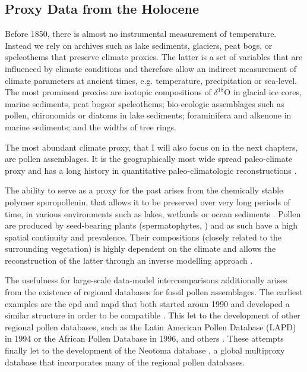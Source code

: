 \begin{refsection}
\subsection{Proxy Data from the Holocene}  \label{sec:intro-paleo-data}
Before 1850, there is almost no instrumental measurement of temperature. Instead we rely on archives such as lake sediments, glaciers, peat bogs, or speleothems that preserve climate proxies. The latter is a set of variables that are influenced by climate conditions and therefore allow an indirect measurement of climate parameters at ancient times, e.g. temperature, precipitation or sea-level. The most prominent proxies are isotopic compositions of $\delta^{18}$O in glacial ice cores\addref, marine sediments\addref, peat bogs\addref or speleothems\addref; bio-ecologic assemblages such as pollen\addref, chironomids \addref or diatoms \addref in lake sediments; foraminifera and alkenone in marine sediments\addref; and the widths of tree rings. 

The most abundant climate proxy, that I will also focus on in the next chapters, are pollen assemblages. It is the  geographically most wide spread paleo-climate proxy \citep{BirksBirks1980}  and has a long history in quantitative paleo-climatologic reconstructions \citep[e.g.][]{Nichols1967, Nichols1969, Bradley1985}. 

The ability to serve as a proxy for the past arises from the chemically stable polymer sporopollenin, that allows it to be preserved over very long periods of time, in various environments such as lakes, wetlands or ocean sediments  \citep{FaegriKalandKrzywinski1989, Havinga1967}. Pollen are produced by seed-bearing plants (spermatophytes, \cite{Wodehouse1935} ) and as such have a high spatial continuity and prevalence. Their compositions (closely related to the surrounding vegetation) is highly dependent on the climate and allows the reconstruction of the latter through an inverse modelling approach .

The usefulness for large-scale data-model intercomparisons additionally arises from the existence of regional databases for fossil pollen assemblages. The earliest examples are the \gls{epd} and \gls{napd}  that both started aroun 1990 and developed a similar structure in order to be compatible \citep{Grimm2008, FyfeBeaulieuBinneyEtAl2009} . This let to the development of other regional pollen databases, such as the Latin American Pollen Database (LAPD) \citep[LAPD, ][]{FlantuaHooghiemstraGrimmEtAl2015, MarchantAlmeidaBehlingEtAl2002} in 1994 or the African Pollen Database \citep[APD][]{VincensLezineBuchetEtAl2007} in 1996, and others \citep[see][]{Grimm2008}. These attempts finally let to the development of the Neotoma database \citep{WilliamsGrimmBloisEtAl2018}, a global multiproxy database that incorporates many of the regional pollen databases.


\end{refsection}
